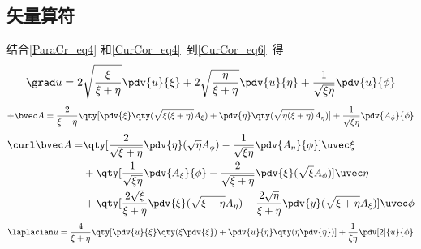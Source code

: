 \subsection{矢量算符}
结合\autoref{ParaCr_eq4} 和\autoref{CurCor_eq4}~到\autoref{CurCor_eq6}~得
\begin{equation}
\grad u = 2\sqrt{\frac{\xi}{\xi + \eta}}\pdv{u}{\xi} + 2\sqrt{\frac{\eta}{\xi + \eta}}\pdv{u}{\eta} + \frac{1}{\sqrt{\xi\eta}}\pdv{u}{\phi}
\end{equation}
\begin{equation}
\div \bvec A = \frac{2}{\xi + \eta}\qty[\pdv{\xi}\qty(\sqrt{\xi(\xi+\eta)}A_\xi) + \pdv{\eta}\qty(\sqrt{\eta(\xi+\eta)}A_\eta)] + \frac{1}{\sqrt{\xi\eta}} \pdv{A_\phi}{\phi}
\end{equation}
\begin{equation}
\begin{aligned}
\curl \bvec A = &\qty[\frac{2}{\sqrt{\xi+\eta}}\pdv{\eta} (\sqrt{\eta}A_\phi) - \frac{1}{\sqrt{\xi\eta}}\pdv{A_\eta}{\phi}]\uvec \xi\\
&+\qty[\frac{1}{\sqrt{\xi\eta}}\pdv{A_\xi}{\phi} - \frac{2}{\sqrt{\xi+\eta}}\pdv{\xi}(\sqrt{\xi}A_\phi)]\uvec\eta\\
&+\qty[\frac{2\sqrt{\xi}}{\xi+\eta}\pdv{\xi}(\sqrt{\xi+\eta}A_\eta) - \frac{2\sqrt{\eta}}{\xi+\eta}\pdv{y}(\sqrt{\xi+\eta}A_\xi)]\uvec\phi
\end{aligned}
\end{equation}
\begin{equation}
\laplacian u = \frac{4}{\xi + \eta} \qty[\pdv{u}{\xi}\qty(\xi\pdv{\xi}) + \pdv{u}{\eta}\qty(\eta\pdv{\eta})] + \frac{1}{\xi\eta}\pdv[2]{u}{\phi}
\end{equation}
